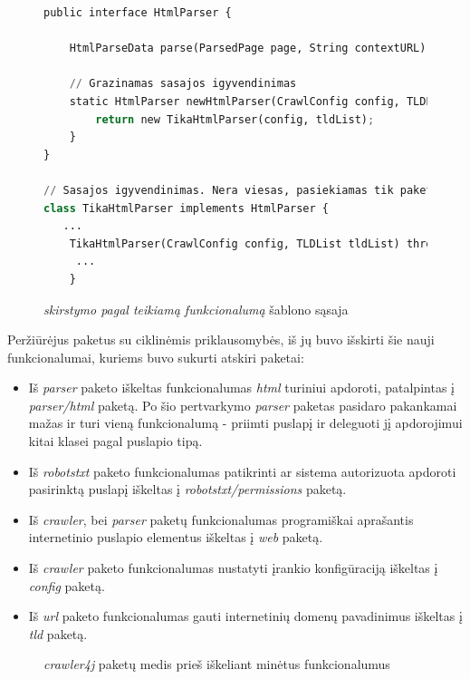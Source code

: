 \begin{figure}[H]
    \begin{lstlisting}[language=Python]
public interface HtmlParser {

    HtmlParseData parse(ParsedPage page, String contextURL) throws ParseException;

    // Grazinamas sasajos igyvendinimas
    static HtmlParser newHtmlParser(CrawlConfig config, TLDList tldList) throws InstantiationException, IllegalAccessException  {
        return new TikaHtmlParser(config, tldList);
    }
}

// Sasajos igyvendinimas. Nera viesas, pasiekiamas tik paketo viduje, nes klase ir konstruktorius nenaudoja public raktazodziu
class TikaHtmlParser implements HtmlParser {
   ...
    TikaHtmlParser(CrawlConfig config, TLDList tldList) throws InstantiationException, IllegalAccessException {
     ...
    }
    \end{lstlisting}
    \caption{\textit{skirstymo pagal teikiamą funkcionalumą} šablono sąsaja}
\end{figure}
Peržiūrėjus paketus su ciklinėmis priklausomybės, iš jų buvo išskirti šie nauji funkcionalumai, kuriems
buvo sukurti atskiri paketai:
\begin{itemize}
    \item Iš \textit{parser} paketo iškeltas funkcionalumas \textit{html} turiniui apdoroti, patalpintas į \textit{parser/html} paketą.
    Po šio pertvarkymo \textit{parser} paketas pasidaro pakankamai mažas ir turi vieną funkcionalumą - priimti puslapį ir deleguoti jį apdorojimui kitai klasei pagal puslapio tipą.
    \item Iš \textit{robotstxt} paketo funkcionalumas patikrinti ar sistema autorizuota apdoroti pasirinktą puslapį iškeltas į \textit{robotstxt/permissions} paketą.
    \item Iš \textit{crawler}, bei \textit{parser} paketų funkcionalumas programiškai aprašantis internetinio puslapio elementus iškeltas į \textit{web} paketą.
    \item Iš \textit{crawler} paketo funkcionalumas nustatyti įrankio konfigūraciją iškeltas į \textit{config} paketą.
    \item Iš \textit{url} paketo funkcionalumas gauti internetinių domenų pavadinimus iškeltas į \textit{tld} paketą.
\end{itemize}

\begin{figure}[H]
    \snugshade
    \endsnugshade
    \caption{\textit{crawler4j} paketų medis prieš iškeliant minėtus funkcionalumus}
\end{figure}


